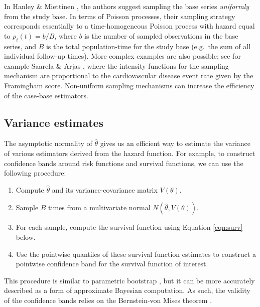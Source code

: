 In Hanley \& Miettinen \citeyearpar{hanley2009fitting}, the authors
suggest sampling the base series \emph{uniformly} from the study base.
In terms of Poisson processes, their sampling strategy corresponds
essentially to a time-homogeneous Poisson process with hazard equal to
\(\rho_i(t) = b/B\), where \(b\) is the number of sampled observations
in the base series, and \(B\) is the total population-time for the study
base (e.g.~the sum of all individual follow-up times). More complex
examples are also possible; see for example Saarela \& Arjas
\citeyearpar{saarela2015non}, where the intensity functions for the
sampling mechanism are proportional to the cardiovascular disease event
rate given by the Framingham score. Non-uniform sampling mechanisms can
increase the efficiency of the case-base estimators.

\hypertarget{variance-estimates}{%
\subsection{Variance estimates}\label{variance-estimates}}

The asymptotic normality of \(\hat{\theta}\) gives us an efficient way
to estimate the variance of various estimators derived from the hazard
function. For example, to construct confidence bands around risk
functions and survival functions, we can use the following procedure:

\begin{enumerate}
\def\labelenumi{\arabic{enumi}.}
\tightlist
\item
  Compute \(\hat{\theta}\) and its variance-covariance matrix
  \(V(\theta)\).
\item
  Sample \(B\) times from a multivariate normal
  \(N\left(\hat{\theta}, V(\theta)\right)\).
\item
  For each sample, compute the survival function using Equation
  \ref{eqn:surv} below.
\item
  Use the pointwise quantiles of these survival function estimates to
  construct a pointwise confidence band for the survival function of
  interest.
\end{enumerate}

This procedure is similar to parametric bootstrap \citep[Section
6.5]{efron1994introduction}, but it can be more accurately described as
a form of approximate Bayesian computation. As such, the validity of the
confidence bands relies on the Bernstein-von Mises theorem
\citep[Chapter 10]{van2000asymptotic}.

